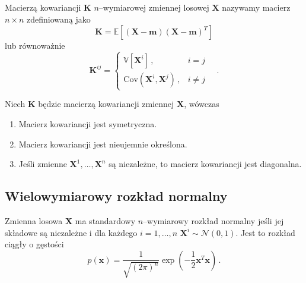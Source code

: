 \documentclass{myclass}
\numberwithin{equation}{subsection}
\begin{document}
\begin{definition}\label{def:covmat} Macierzą kowariancji \(\bm{K}\)
\(n\)--wymiarowej zmiennej losowej \(\bm{X}\) nazywamy macierz \(n \times n\) zdefiniowaną jako
\begin{equation*}
    \bm{K} = \mathbb{E}[(\bm{X} - \bm{m})(\bm{X} - \bm{m})^T]
\end{equation*}
lub równoważnie
\begin{equation*}
    \bm{K}^{ij} = \begin{cases}
        \mathbb{V}[\bm{X}^i]\,,&i=j\\
        \mathrm{Cov}(\bm{X}^i, \bm{X}^j)\,,&i\neq j
    \end{cases}\quad.
\end{equation*}
\end{definition}

\begin{theorem}\label{th:covmat} Niech \(\bm{K}\) będzie macierzą
kowariancji zmiennej \(\bm{X}\), wówczas
\begin{enumerate}
    \item Macierz kowariancji jest symetryczna.
    \item Macierz kowariancji jest nieujemnie określona.
    \item Jeśli zmienne \(\bm{X}^1,\ldots,\bm{X}^n\) są niezależne, to macierz kowariancji jest
    diagonalna.
\end{enumerate}
\end{theorem}


\subsection{Wielowymiarowy rozkład normalny}

\begin{definition}
Zmienna losowa \(\bm{X}\) ma standardowy \(n\)--wymiarowy rozkład normalny jeśli jej składowe są
niezależne i dla każdego \(i=1,\ldots,n\) \(\bm{X}^i \sim \mathcal{N}(0,1)\). Jest to rozkład ciągły
o gęstości
\begin{equation*}
    p(\bm{x}) = \frac{1}{\sqrt{(2\pi)^n}}\exp\left(-\frac{1}{2}\bm{x}^T\bm{x}\right)\,.
\end{equation*}
\end{definition}
\end{document}
